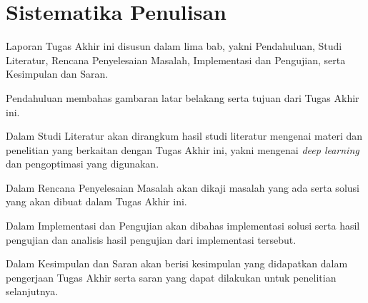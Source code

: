 


%     

%     

\section{Sistematika Penulisan}
Laporan Tugas Akhir ini disusun dalam lima bab, yakni Pendahuluan, Studi Literatur, Rencana Penyelesaian Masalah, Implementasi dan Pengujian, serta Kesimpulan dan Saran.

Pendahuluan membahas gambaran latar belakang serta tujuan dari Tugas Akhir ini.

Dalam Studi Literatur akan dirangkum hasil studi literatur mengenai materi dan penelitian yang berkaitan dengan Tugas Akhir ini, yakni mengenai \emph{deep learning} dan pengoptimasi yang digunakan.

Dalam Rencana Penyelesaian Masalah akan dikaji masalah yang ada serta solusi yang akan dibuat dalam Tugas Akhir ini.

Dalam Implementasi dan Pengujian akan dibahas implementasi solusi serta hasil pengujian dan analisis hasil pengujian dari implementasi tersebut.

Dalam Kesimpulan dan Saran akan berisi kesimpulan yang didapatkan dalam pengerjaan Tugas Akhir serta saran yang dapat dilakukan untuk penelitian selanjutnya.
